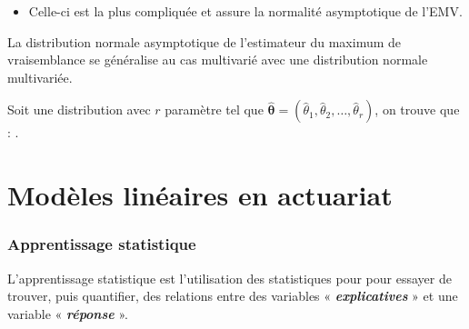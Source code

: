 \documentclass[french]{article}
\begin{document}
\begin{multicols*}{2}
\begin{definitionNOHFILLprop}
\begin{description}
		\begin{itemize}
		\item	Celle-ci est la plus compliquée et assure la normalité asymptotique de l'EMV.
		\end{itemize}
\end{description}
\end{definitionNOHFILLprop}


\begin{rappel_enhanced}[Contexte]
La distribution normale asymptotique de l'estimateur du maximum de vraisemblance se généralise au cas multivarié avec une distribution normale multivariée.
\end{rappel_enhanced}

Soit une distribution avec $r$ paramètre tel que $\hat{\bm{\theta}} = (\hat{\theta}_{1}, \hat{\theta}_{2}, \dots, \hat{\theta}_{r})$, on trouve que : .





\newpage
\part{Modèles linéaires en actuariat}\label{chapt:modLin}
\section{Apprentissage statistique}\label{sec:StatLearning}
\begin{definitionNOHFILL}
L'apprentissage statistique est l'utilisation des statistiques pour pour essayer de trouver, puis quantifier, des relations entre des variables « \textit{\textbf{explicatives}} » et une variable « \textbf{\textit{réponse}} ». 
\end{definitionNOHFILL}



\columnbreak

\end{multicols*}
\end{document}

